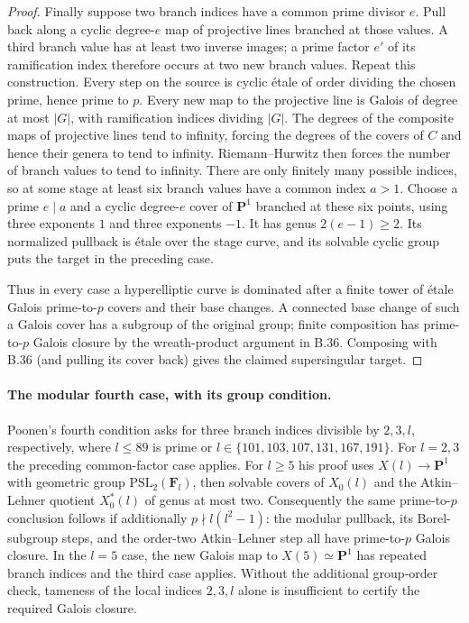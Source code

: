 \documentclass[11pt,a4paper]{article}
\newcommand{\F}{\mathbf F}
\begin{document}
\begin{proof}
Finally suppose two branch indices have a common prime divisor
$e$. Pull back along a cyclic degree-$e$ map of projective lines
branched at those values. A third branch value has at least two
inverse images; a prime factor $e'$ of its ramification index
therefore occurs at two new branch values. Repeat this construction.
Every step on the source is cyclic \'etale of order dividing the
chosen prime, hence prime to $p$. Every new map to the projective
line is Galois of degree at most $|G|$, with ramification indices
dividing $|G|$. The degrees of the composite maps of projective
lines tend to infinity, forcing the degrees of the covers of $C$
and hence their genera to tend to infinity. Riemann--Hurwitz then
forces the number of branch values to tend to infinity. There are
only finitely many possible indices, so at some stage at least six
branch values have a common index $a>1$. Choose a prime $e\mid a$
and a cyclic degree-$e$ cover of $\mathbf P^1$ branched at these
six points, using three exponents $1$ and three exponents $-1$.
It has genus $2(e-1)\ge2$. Its normalized pullback is \'etale
over the stage curve, and its solvable cyclic group puts the target
in the preceding case.

Thus in every case a hyperelliptic curve is dominated after a
finite tower of \'etale Galois prime-to-$p$ covers and their base
changes. A connected base change of such a Galois cover has a
subgroup of the original group; finite composition has prime-to-$p$
Galois closure by the wreath-product argument in B.36. Composing
with B.36 (and pulling its cover back) gives the claimed
supersingular target.
\end{proof}

\paragraph{The modular fourth case, with its group condition.}
Poonen's fourth condition asks for three branch indices divisible
by $2,3,l$, respectively, where $l\le89$ is prime or
$l\in\{101,103,107,131,167,191\}$. For $l=2,3$ the preceding
common-factor case applies. For $l\ge5$ his proof uses
$X(l)\to\mathbf P^1$ with geometric group
$\mathrm{PSL}_2(\F_l)$, then solvable covers of $X_0(l)$ and the
Atkin--Lehner quotient $X_0^*(l)$ of genus at most two.
Consequently the same prime-to-$p$ conclusion follows if additionally
$p\nmid l(l^2-1)$: the modular pullback, its Borel-subgroup steps,
and the order-two Atkin--Lehner step all have prime-to-$p$ Galois
closure. In the $l=5$ case, the new Galois map to $X(5)\simeq
\mathbf P^1$ has repeated branch indices and the third case applies.
Without the additional group-order check, tameness of the local
indices $2,3,l$ alone is insufficient to certify the required
Galois closure.\citep[Lemma~2.3 and \S3.4]{LA_Poonen2005}
\end{document}
